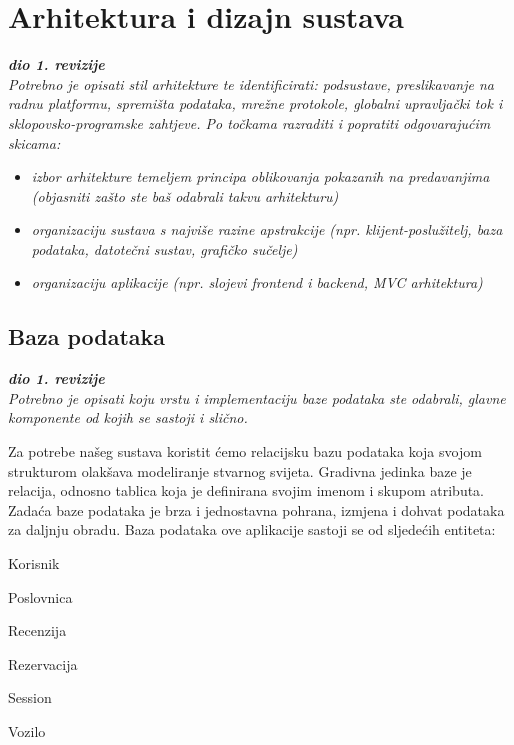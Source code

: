 \chapter{Arhitektura i dizajn sustava}
		
		\textbf{\textit{dio 1. revizije}}\\

		\textit{ Potrebno je opisati stil arhitekture te identificirati: podsustave, preslikavanje na radnu platformu, spremišta podataka, mrežne protokole, globalni upravljački tok i sklopovsko-programske zahtjeve. Po točkama razraditi i popratiti odgovarajućim skicama:}
	\begin{itemize}
		\item 	\textit{izbor arhitekture temeljem principa oblikovanja pokazanih na predavanjima (objasniti zašto ste baš odabrali takvu arhitekturu)}
		\item 	\textit{organizaciju sustava s najviše razine apstrakcije (npr. klijent-poslužitelj, baza podataka, datotečni sustav, grafičko sučelje)}
		\item 	\textit{organizaciju aplikacije (npr. slojevi frontend i backend, MVC arhitektura) }		
	\end{itemize}

	
		

		

				
		\section{Baza podataka}
			
			\textbf{\textit{dio 1. revizije}}\\
			
		\textit{Potrebno je opisati koju vrstu i implementaciju baze podataka ste odabrali, glavne komponente od kojih se sastoji i slično.}
		
		    \noindent Za potrebe našeg sustava koristit ćemo relacijsku bazu podataka koja
            svojom strukturom olakšava modeliranje stvarnog svijeta. Gradivna jedinka
            baze je relacija, odnosno tablica koja je definirana svojim imenom i 
            skupom atributa. Zadaća baze podataka je brza i jednostavna pohrana, 
            izmjena i dohvat podataka za daljnju obradu.
            Baza podataka ove aplikacije sastoji se od sljedećih entiteta:
            
            \begin{packed_item}
                \item Korisnik
                \item Poslovnica
                \item Recenzija
                \item Rezervacija
                \item Session
                \item Vozilo
            \end{packed_item}
		
